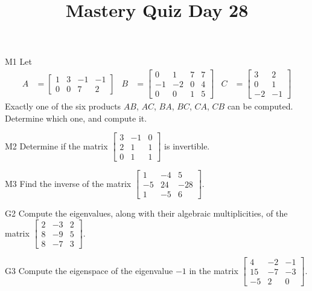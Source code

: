 \documentclass{sbgLAquiz}
\title{Mastery Quiz Day 28 }
\begin{document}
\begin{problem}{M1}
Let
\begin{align*}
A &= \begin{bmatrix} 1 & 3 & -1 & -1 \\ 0 & 0 & 7 & 2 \end{bmatrix} & B &= \begin{bmatrix} 0 & 1 & 7 & 7 \\ -1 & -2 & 0 & 4 \\ 0 & 0 & 1 & 5 \end{bmatrix} & C&=\begin{bmatrix} 3 & 2 \\ 0 & 1 \\ -2 & -1 \end{bmatrix}
\end{align*}
Exactly one of the six products $AB$, $AC$, $BA$, $BC$, $CA$, $CB$ can be computed.  Determine which one, and compute it.
\end{problem}

\begin{problem}{M2}
Determine if the matrix $\begin{bmatrix} 3 & -1 & 0  \\ 2 & 1 & 1  \\ 0 & 1 & 1   \end{bmatrix}$ is invertible.
\end{problem}
\newpage

\begin{problem}{M3}
  Find the inverse of the matrix
  \(\begin{bmatrix}
    1 & -4 & 5  \\
    -5 & 24 & -28  \\
    1 & -5 & 6
  \end{bmatrix}\).
\end{problem}

\begin{problem}{G2}
Compute the eigenvalues, along with their algebraic multiplicities, of the matrix $ \begin{bmatrix}2 & -3 & 2 \\ 8 & -9 & 5 \\ 8 & -7 & 3 \end{bmatrix}$.
\end{problem}
\newpage

\begin{problem}{G3}
Compute the eigenspace of the eigenvalue $-1$ in the matrix $\begin{bmatrix} 4 & -2 & -1 \\ 15 & -7 & -3 \\ -5 & 2 & 0 \end{bmatrix}$.
\end{problem}
\end{document}
